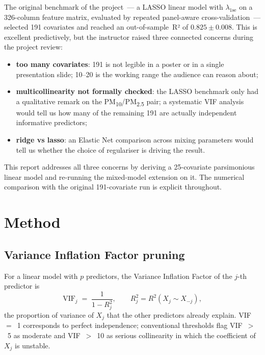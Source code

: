 \documentclass[11pt,a4paper]{article}
\begin{document}
The original benchmark of the project~--- a LASSO linear model with
$\lambda_{\mathrm{1se}}$ on a 326-column feature matrix, evaluated by
repeated panel-aware cross-validation~--- selected 191 covariates and
reached an out-of-sample~R² of $0.825 \pm 0.008$. This is excellent
predictively, but the instructor raised three connected concerns
during the project review:
\begin{itemize}[leftmargin=2em]
  \item \textbf{too many covariates}: 191 is not legible in a poster
    or in a single presentation slide; 10--20 is the working range
    the audience can reason about;
  \item \textbf{multicollinearity not formally checked}: the LASSO
    benchmark only had a qualitative remark on the
    PM\textsubscript{10}/PM\textsubscript{2.5} pair; a systematic VIF
    analysis would tell us how many of the remaining 191 are actually
    independent informative predictors;
  \item \textbf{ridge vs lasso}: an Elastic Net comparison across
    mixing parameters would tell us whether the choice of regulariser
    is driving the result.
\end{itemize}
This report addresses all three concerns by deriving a 25-covariate
parsimonious linear model and re-running the mixed-model extension on
it. The numerical comparison with the original 191-covariate run is
explicit throughout.

\section{Method}

\subsection{Variance Inflation Factor pruning}

For a linear model with $p$ predictors, the Variance Inflation Factor
of the $j$-th predictor is
\begin{equation}
  \mathrm{VIF}_j \;=\; \frac{1}{1 - R^{2}_{j}},
  \qquad
  R^{2}_{j} = R^{2}\!\left(X_j \sim X_{-j}\right),
  \label{eq:vif}
\end{equation}
the proportion of variance of $X_j$ that the other predictors already
explain. VIF~$=$~1 corresponds to perfect independence; conventional
thresholds flag VIF~$>$~5 as moderate and VIF~$>$~10 as serious
collinearity in which the coefficient of $X_j$ is unstable.
\end{document}
